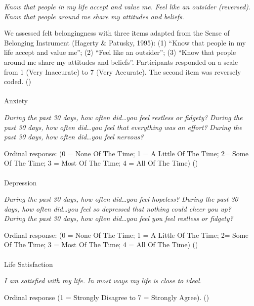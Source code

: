 \documentclass[
  single column]{article}
\makeatletter
\let\oldparagraph\paragraph
\renewcommand{\paragraph}{
    \@ifstar
      \xxxParagraphStar
      \xxxParagraphNoStar
  }
\newcommand{\xxxParagraphStar}[1]{\oldparagraph*{#1}\mbox{}}
\newcommand{\xxxParagraphNoStar}[1]{\oldparagraph{#1}\mbox{}}
\makeatother
\begin{document}
\emph{Know that people in my life accept and value me.} \emph{Feel like
an outsider (reversed).} \emph{Know that people around me share my
attitudes and beliefs.}

We assessed felt belongingness with three items adapted from the Sense
of Belonging Instrument (Hagerty \& Patusky, 1995): (1) ``Know that
people in my life accept and value me''; (2) ``Feel like an outsider'';
(3) ``Know that people around me share my attitudes and beliefs''.
Participants responded on a scale from 1 (Very Inaccurate) to 7 (Very
Accurate). The second item was reversely coded.
()

\paragraph{Anxiety}\label{anxiety}

\emph{During the past 30 days, how often did\ldots you feel restless or
fidgety?} \emph{During the past 30 days, how often did\ldots you feel
that everything was an effort?} \emph{During the past 30 days, how often
did\ldots you feel nervous?}

Ordinal response: (0 = None Of The Time; 1 = A Little Of The Time; 2=
Some Of The Time; 3 = Most Of The Time; 4 = All Of The Time)
()

\paragraph{Depression}\label{depression}

\emph{During the past 30 days, how often did\ldots you feel hopeless?}
\emph{During the past 30 days, how often did\ldots you feel so depressed
that nothing could cheer you up?} \emph{During the past 30 days, how
often did\ldots you feel you feel restless or fidgety?}

Ordinal response: (0 = None Of The Time; 1 = A Little Of The Time; 2=
Some Of The Time; 3 = Most Of The Time; 4 = All Of The Time)
()

\paragraph{Life Satisfaction}\label{life-satisfaction}

\emph{I am satisfied with my life.} \emph{In most ways my life is close
to ideal.}

Ordinal response (1 = Strongly Disagree to 7 = Strongly Agree).
()
\end{document}
